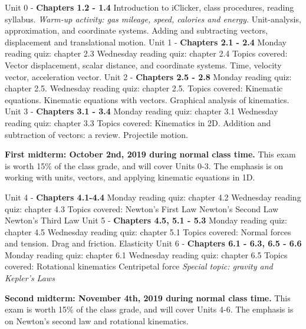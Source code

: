 \documentclass[10pt]{article}
\begin{document}
\begin{outline}[enumerate]
\1 Unit 0 - \textbf{Chapters 1.2 - 1.4}
\2 Introduction to iClicker, class procedures, reading syllabus.
\2 \textit{Warm-up activity: gas mileage, speed, calories and energy.}
\2 Unit-analysis, approximation, and coordinate systems.
\2 Adding and subtracting vectors, displacement and translational motion.
\1 Unit 1 - \textbf{Chapters 2.1 - 2.4}
\2 Monday reading quiz: chapter 2.3
\2 Wednesday reading quiz: chapter 2.4
\2 Topics covered:
\3 Vector displacement, scalar distance, and coordinate systems.
\3 Time, velocity vector, acceleration vector.
\1 Unit 2 - \textbf{Chapters 2.5 - 2.8}
\2 Monday reading quiz: chapter 2.5.
\2 Wednesday reading quiz: chapter 2.5.
\2 Topics covered:
\3 Kinematic equations.
\3 Kinematic equations with vectors.
\3 Graphical analysis of kinematics.
\1 Unit 3 - \textbf{Chapters 3.1 - 3.4}
\2 Monday reading quiz: chapter 3.1
\2 Wednesday reading quiz: chapter 3.3
\2 Topics covered:
\3 Kinematics in 2D.
\3 Addition and subtraction of vectors: a review.
\3 Projectile motion.

\1 \textbf{First midterm: October 2nd, 2019 during normal class time.} This exam is worth 15\% of the class grade, and will cover Units 0-3.  The emphasis is on working with units, vectors, and applying kinematic equations in 1D. 

\1 Unit 4 - \textbf{Chapters 4.1-4.4}
\2 Monday reading quiz: chapter 4.2
\2 Wednesday reading quiz: chapter 4.3
\2 Topics covered:
\3 Newton's First Law
\3 Newton's Second Law
\3 Newton's Third Law
\1 Unit 5 - \textbf{Chapters 4.5, 5.1 - 5.3}
\2 Monday reading quiz: chapter 4.5
\2 Wednesday reading quiz: chapter 5.1
\2 Topics covered:
\3 Normal forces and tension.
\3 Drag and friction.
\3 Elasticity
\1 Unit 6 - \textbf{Chapters 6.1 - 6.3, 6.5 - 6.6}
\2 Monday reading quiz: chapter 6.1
\2 Wednesday reading quiz: chapter 6.5
\2 Topics covered:
\3 Rotational kinematics
\3 Centripetal force
\3 \textit{Special topic: gravity and Kepler's Laws}

\1 \textbf{Second midterm: November 4th, 2019 during normal class time.} This exam is worth 15\% of the class grade, and will cover Units 4-6.  The emphasis is on Newton's second law and rotational kinematics.


\end{outline}
\end{document}
